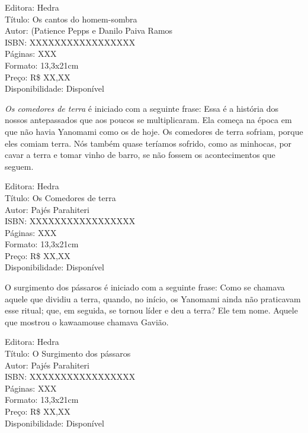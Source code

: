 \begin{ficha}
Editora: Hedra\\
Título: Os cantos do homem-sombra\\
Autor: (Patience Pepps e Danilo Paiva Ramos\\ 
ISBN: XXXXXXXXXXXXXXXXX\\
Páginas: XXX\\
Formato: 13,3x21cm\\
Preço: R\$ XX,XX\\
Disponibilidade: Disponível
\end{ficha}

\pagebreak


\noindent{}\textit{Os comedores de terra} é iniciado com a seguinte frase: Essa é a história dos nossos antepassados que aos poucos se multiplicaram. Ela começa na época em que não havia Yanomami como os de hoje. Os comedores de terra sofriam, porque eles comiam terra. Nós também quase teríamos sofrido, como as minhocas, por cavar a terra e tomar vinho de barro, se não fossem os acontecimentos que seguem.

\begin{ficha}
Editora: Hedra\\
Título: Os Comedores de terra\\
Autor:  Pajés Parahiteri\\ 
ISBN: XXXXXXXXXXXXXXXXX\\
Páginas: XXX\\
Formato: 13,3x21cm\\
Preço: R\$ XX,XX\\
Disponibilidade: Disponível
\end{ficha}

\pagebreak


\noindent{}O surgimento dos pássaros é iniciado com a seguinte frase: Como se chamava aquele que dividiu a terra, quando, no início, os Yanomami ainda não praticavam esse ritual; que, em seguida, se tornou líder e deu a terra? Ele tem nome. Aquele que mostrou o kawaamouse chamava Gavião.

\begin{ficha}
Editora: Hedra\\
Título: O Surgimento dos pássaros\\
Autor:  Pajés Parahiteri\\ 
ISBN: XXXXXXXXXXXXXXXXX\\
Páginas: XXX\\
Formato: 13,3x21cm\\
Preço: R\$ XX,XX\\
Disponibilidade: Disponível
\end{ficha}

